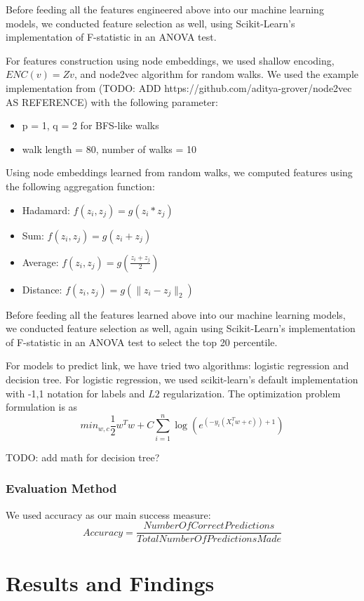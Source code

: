 \documentclass[12pt,twocolumn]{article}
\begin{document}
Before feeding all the features engineered above into our machine learning models, we conducted feature selection as well, using Scikit-Learn's implementation of F-statistic in an ANOVA test.

For features construction using node embeddings, we used shallow encoding, $ENC(v)= Zv$, and node2vec algorithm for random walks.  We used the example implementation from (TODO: ADD https://github.com/aditya-grover/node2vec AS REFERENCE) with the following parameter:
\begin{itemize}
    \item p = 1, q = 2 for BFS-like walks
    \item walk length = 80, number of walks = 10
\end{itemize}
Using node embeddings learned from random walks, we computed features using the following aggregation function:
\begin{itemize}
    \item Hadamard: $f(z_i,z_j) = g(z_i * z_j)$
    \item Sum: $f(z_i,z_j) = g(z_i + z_j)$
    \item Average: $f(z_i,z_j) = g(\frac{z_i + z_j}{2})$
    \item Distance: $f(z_i,z_j) = g(\|z_i - z_j\|_2)$
\end{itemize}

Before feeding all the features learned above into our machine learning models, we conducted feature selection as well, again using Scikit-Learn's implementation of F-statistic in an ANOVA test to select the top 20 percentile.

For models to predict link, we have tried two algorithms: logistic regression and decision tree. For logistic regression, we used scikit-learn's \cite{scikit-learn} default implementation with {-1,1} notation for labels and $L2$ regularization. The optimization problem formulation is as $$min_{w,c} \frac{1}{2} w^Tw + C \sum_{i = 1}^{n} \log (e^{(-y_i (X^T_i w + c)) + 1})$$

TODO: add math for decision tree?


\subsubsection{Evaluation Method}
We used accuracy as our main success measure: $$Accuracy = \frac{NumberOfCorrectPredictions}{TotalNumberOfPredictionsMade}$$

\section{Results and Findings}
\end{document}
